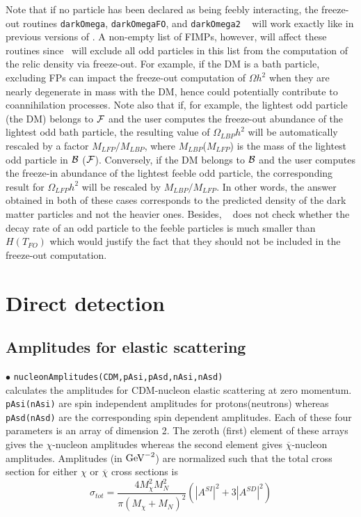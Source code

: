 \documentclass[12pt,a4paper]{article}
\begin{document}
Note that if no particle has been declared as being feebly interacting, the freeze-out routines \verb|darkOmega|, \verb|darkOmegaFO|, and \verb|darkOmega2| ~\cite{Belanger:2014vza} will work exactly like in previous versions of \micro. A non-empty list of FIMPs, however, will affect these routines since \micro~will exclude all odd particles in this list from the computation of the relic density via freeze-out. For example, if the DM is a bath particle, excluding FPs can impact the freeze-out computation of $\Omega h^2$ when they are nearly degenerate in mass with the DM, hence could potentially contribute to coannihilation processes. Note also that if, for example, the lightest odd particle (the DM) belongs to ${\cal F}$ and the user computes the freeze-out abundance of the lightest odd bath particle, the resulting  value of $\Omega_{LBP} h^2$  will be automatically rescaled by a factor $M_{LFP}/M_{LBP}$, where $M_{LBP}$($M_{LFP}$) is the mass of the lightest odd particle in ${\cal B}$ (${\cal F}$). Conversely, if the DM belongs to ${\cal B}$ and the user computes the freeze-in abundance of the lightest feeble odd particle, the corresponding result for $\Omega_{LFP} h^2$ will be rescaled by $M_{LBP}/M_{LFP}$. In other words, the answer obtained in both of these cases corresponds to the predicted density of the dark matter particles and not the heavier ones. Besides, \micro~ does not check whether the decay rate of an odd particle to the feeble particles is much smaller than $H(T_{FO})$ which would justify the fact that they should not be included in the freeze-out computation.



\section{Direct detection}
\subsection{Amplitudes for elastic scattering}
\noindent
 $\bullet$ \verb|nucleonAmplitudes(CDM,pAsi,pAsd,nAsi,nAsd)|\\
calculates the amplitudes for CDM-nucleon elastic
scattering at zero momentum. \verb|pAsi(nAsi)| are spin
independent amplitudes for protons(neutrons) whereas
\verb|pAsd(nAsd)| are the corresponding spin dependent amplitudes.
Each of these four parameters is an array of 
dimension 2. The zeroth (first) element of these arrays gives the
$\chi$-nucleon amplitudes whereas the second element gives
$\overline{\chi}$-nucleon amplitudes. Amplitudes (in ${\rm GeV}^{-2}$) are normalized
such that the total cross section for either $\chi$ or $\overline
\chi$ cross sections is
\begin{equation}
\sigma_{tot}=\frac{4M_{\chi}^2 M_N^2}{\pi(M_{\chi}+M_N)^2}(|A^{SI}|^2+3|A^{SD}|^2)
\label{eq:norm}
\end{equation}
\end{document}
